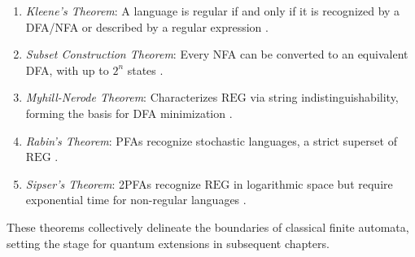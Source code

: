 \begin{enumerate}
    \item \textit{Kleene's Theorem}: A language is regular if and only if it is recognized by a DFA/NFA or described by a regular expression \cite{hopcroft2006introduction}.
    \item \textit{Subset Construction Theorem}: Every NFA can be converted to an equivalent DFA, with up to $2^n$ states \cite{hopcroft2006introduction}.
    \item \textit{Myhill-Nerode Theorem}: Characterizes $\text{REG}$ via string indistinguishability, forming the basis for DFA minimization \cite{hopcroft2006introduction}.
    \item \textit{Rabin's Theorem}: PFAs recognize stochastic languages, a strict superset of $\text{REG}$ \cite{rabin1963probabilistic}.
    \item \textit{Sipser's Theorem}: 2PFAs recognize $\text{REG}$ in logarithmic space but require exponential time for non-regular languages \cite{sipser1980halting}.
\end{enumerate} 

These theorems collectively delineate the boundaries of classical finite automata, setting the stage for quantum extensions in subsequent chapters. 
\newpage